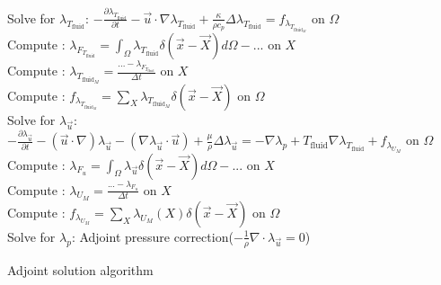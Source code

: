 \documentclass[10pt]{article} %
\begin{document}
\begin{center}
	\newpage
\begin{algorithm}[H]
	\SetAlgoLined
	{
		{
			Solve for $\lambda_{T_{\text{fluid}}}$: $- \frac{\partial \lambda_{T_{\text{fluid}}}}{\partial t} -\vec{u} \cdot \nabla \lambda_{T_{\text{fluid}}} + \frac{\kappa}{\rho c_p} \Delta  \lambda_{T_{\text{fluid}}} = f_{\lambda_{T_{\text{fluid}_M}}} $ \quad on $\Omega$\\
			Compute : $\lambda_{F_{T_{\text{fluid}}}} = \int_{\Omega} \lambda_{T_{\text{fluid}}} \delta (\vec{x}-\vec{X}) d\Omega - ... $ \quad on $X$\\
			Compute : $\lambda_{T_{\text{fluid}_M}} = \frac{... - \lambda_{F_{T_{\text{fluid}}}}}{\Delta t}$ \quad on $X$\\
			Compute : $f_{\lambda_{T_{\text{fluid}_M}}} = \sum_{X} \lambda_{T_{\text{fluid}_M}} \delta (\vec{x}-\vec{X})$ \quad on $\Omega$\\
		}
		{
			Solve for $\lambda_{\vec{u}}$: $ -\frac{\partial \lambda_{\vec{u}}}{\partial t}-(\vec{u}\cdot\nabla) \lambda_{\vec{u}} - \left(\nabla \lambda_{\vec{u}} \cdot \vec{u}\right) + \frac{\mu}{\rho} \Delta \lambda_{\vec{u}} = - \nabla\lambda_p + T_{\text{fluid}} \nabla \lambda_{T_{\text{fluid}}} + f_{\lambda_{U_M}}$ \quad on $\Omega$\\
			Compute : $\lambda_{F_u} = \int_{\Omega} \lambda_{\vec{u}} \delta (\vec{x}-\vec{X}) d\Omega - ...$  \quad on $X$\\
			Compute : $\lambda_{U_M} = \frac{...-\lambda_{F_u}}{\Delta t}$ \quad on $X$\\
			Compute : $f_{\lambda_{U_M}} = \sum_X \lambda_{U_M}(X) \delta(\vec{x}-\vec{X})$ \quad on $\Omega$\\
			Solve for $\lambda_p$: Adjoint pressure correction($-\frac{1}{\rho} \nabla \cdot \lambda_{\vec{u}}=0$)\\
		}
	}
	\caption{Adjoint solution algorithm}
\end{algorithm}


\end{center}
\end{document}
